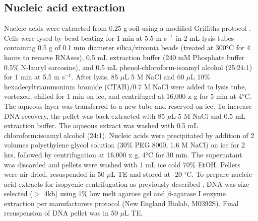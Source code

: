 \documentclass{article}
\begin{document}
\subsection{Nucleic acid extraction}
Nucleic acids were extracted from 0.25 g soil using a modified Griffiths
protocol \citep{Griffiths_2000}. Cells were lysed by bead beating for
1 min at 5.5 m s$^{-1}$ in 2 mL lysis tubes containing 0.5 g of 0.1 mm diameter
  silica/zirconia beads (treated at 300°C for 4 hours to remove RNAses), 0.5 mL
  extraction buffer (240 mM Phosphate buffer 0.5\% N-lauryl sarcosine), and 0.5
  mL phenol-chloroform-isoamyl alcohol (25:24:1) for 1 min at
5.5 m s$^{-1}$. After lysis, 85 $\mu$L 5 M NaCl and 60 $\mu$L 10\% hexadecyltriammonium
  bromide (CTAB)/0.7 M NaCl were added to lysis tube, vortexed, chilled for
  1 min on ice, and centrifuged at 16,000 x g for 5 min at 4°C. The aqueous
  layer was transferred to a new tube and reserved on ice. To increase DNA
  recovery, the pellet was back extracted with 85 $\mu$L 5 M NaCl and
0.5 mL extraction buffer. The aqueous extract was washed with 0.5 mL
chloroform:isoamyl alcohol (24:1). Nucleic acids were precipitated by addition
of 2 volumes polyethylene glycol solution (30\% PEG 8000, 1.6 M NaCl) on ice
for 2 hrs, followed by centrifugation at 16,000 x g, 4°C for 30 min. The
supernatant was discarded and pellets were washed with 1 mL ice cold 70\% EtOH.
Pellets were air dried, resuspended in 50 $\mu$L TE and stored at -20
$^{\circ}$C. To prepare nucleic acid extracts for isopycnic centrifugation as
previously described \citep{Buckley_2007}, DNA was size selected ($>$ 4kb)
using 1\% low melt agarose gel and $\beta$-agarase I enzyme extraction per
manufacturers protocol (New England Biolab, M0392S).  Final resuspension of DNA
pellet was in 50 $\mu$L TE.   
\end{document}
